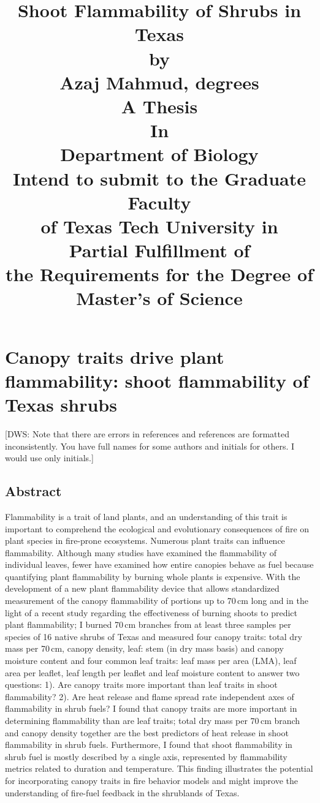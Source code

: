 \documentclass[12pt]{report}
\title{
  Shoot Flammability of Shrubs in Texas\\[15pt]
by\\
Azaj Mahmud, degrees\\
A Thesis\\
In\\
Department of Biology\\
Intend to submit to the Graduate Faculty\\
of Texas Tech University in\\
Partial Fulfillment of\\
the Requirements for the Degree of\\
Master's of Science\\}
\begin{document}
\maketitle
\tableofcontents
\listoftables
\listoffigures
\doublespacing

\chapter{Canopy traits drive plant flammability: shoot flammability of Texas shrubs}

[DWS: Note that there are errors in references and references are formatted inconsistently. You have full names for some authors and initials for others. I would use only initials.]

\section{Abstract}
    
Flammability is a trait of land plants, and an understanding of this trait is important to comprehend the ecological and evolutionary consequences of fire on plant species in fire-prone ecosystems. Numerous plant traits can influence flammability. Although many studies have examined the flammability of individual leaves, fewer have examined how entire canopies behave as fuel because quantifying plant flammability by burning whole plants is expensive. With the development of a new plant flammability device that allows standardized measurement of the canopy flammability of portions up to 70\,cm long and in the light of a recent study regarding the effectiveness of burning shoots to predict plant flammability; I burned 70\,cm branches from at least three samples per species of 16 native shrubs of Texas and measured four canopy traits: total dry mass per 70\,cm, canopy density, leaf: stem (in dry mass basis) and canopy moisture content and four common leaf traits: leaf mass per area (LMA), leaf area per leaflet, leaf length per leaflet and leaf moisture content to answer two questions: 1). Are canopy traits more important than leaf traits in shoot flammability? 2). Are heat release and flame spread rate independent axes of flammability in shrub fuels? I found that canopy traits are more important in determining flammability than are leaf traits; total dry mass per 70\,cm branch and canopy density together are the best predictors of heat release in shoot flammability in shrub fuels. Furthermore, I found that shoot flammability in shrub fuel is mostly described by a single axis, represented by flammability metrics related to duration and temperature. This finding illustrates the potential for incorporating canopy traits in fire behavior models and might improve the understanding of fire-fuel feedback in the shrublands of Texas.
\end{document}

